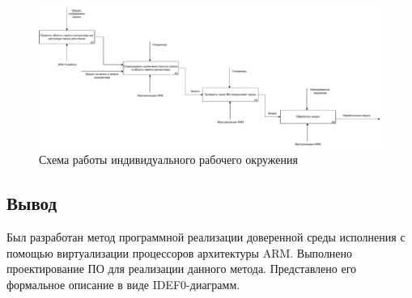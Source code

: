 \begin{figure}[h]
	\centering
	\includegraphics[width=\textwidth]{img/idef0-trap-and-emulate-2.pdf}
	\caption{Схема работы индивидуального рабочего окружения}
	\label{fig:idef0-trap-and-emulate-2}
\end{figure}

\subsection{Вывод}

Был разработан метод программной реализации доверенной среды исполнения с помощью виртуализации процессоров архитектуры ARM. Выполнено проектирование ПО для реализации данного метода. Представлено его формальное описание в виде IDEF0-диаграмм.

\pagebreak
